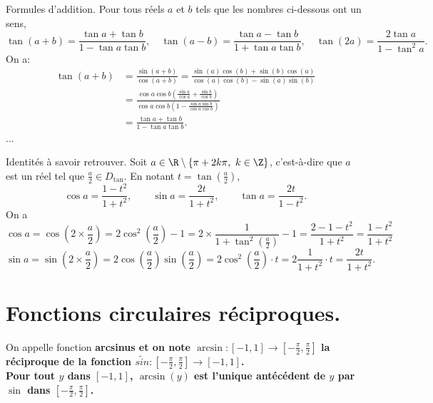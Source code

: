 \documentclass[11pt]{article}
\begin{document}
\begin{prop}{Formules d'addition.}{}
    Pour tous réels $a$ et $b$ tels que les nombres ci-dessous ont un sens,
    \begin{equation*}
        \tan(a+b)=\frac{\tan a+\tan b}{1-\tan a\tan b},\quad\tan(a-b)=\frac{\tan a-\tan b}{1+\tan a\tan b}, \quad \tan(2a)=\frac{2\tan a}{1-\tan^2a}.
    \end{equation*}
    \tcblower
    On a:
    \begin{align*}
        \tan(a+b)&=\frac{\sin(a+b)}{\cos(a+b)}=\frac{\sin(a)\cos(b)+\sin(b)\cos(a)}{\cos(a)\cos(b)-\sin(a)\sin(b)}\\
        &=\frac{\cos a\cos b\left( \frac{\sin a}{\cos a} + \frac{\sin b}{\cos b} \right)}{\cos a\cos b\left( 1 - \frac{\sin a\sin b}{\cos a\cos b} \right)}\\
        &=\frac{\tan a+\tan b}{1-\tan a\tan b}.
    \end{align*}
    ...
\end{prop}

\begin{corr}{Identités à savoir retrouver.}{}
    Soit $a\in\R\setminus\{\pi+2k\pi,~k\in\Z\}$, c'est-à-dire que $a$ est un réel tel que $\frac{a}{2}\in D_{\tan}$. En notant $t=\tan(\frac{a}{2})$,
    \begin{equation*}
        \cos a=\frac{1-t^2}{1+t^2}, \qquad \sin a=\frac{2t}{1+t^2}, \qquad \tan a=\frac{2t}{1-t^2}.
    \end{equation*}
    \tcblower
    On a
    \begin{equation*}
        \cos a=\cos(2\times\frac{a}{2})=2\cos^2(\frac{a}{2})-1=2\times\frac{1}{1+\tan^2(\frac{a}{2})}-1=\frac{2-1-t^2}{1+t^2}=\frac{1-t^2}{1+t^2}
    \end{equation*}
    \begin{equation*}
        \sin a = \sin(2\times\frac{a}{2})=2\cos(\frac{a}{2})\sin(\frac{a}{2})=2\cos^2(\frac{a}{2})\cdot t=2\frac{1}{1+t^2}\cdot t=\frac{2t}{1+t^2}.
    \end{equation*}
\end{corr}

\section{Fonctions circulaires réciproques.}

\begin{defi}{}{}
    On appelle fonction \bf{arcsinus} et on note $\arcsin:[-1,1]\to[-\frac{\pi}{2},\frac{\pi}{2}]$ la réciproque de la fonction $\tilde{sin}:[-\frac{\pi}{2},\frac{\pi}{2}]\to[-1,1]$.\\
    Pour tout $y$ dans $[-1,1]$, $\arcsin(y)$ est l'unique antécédent de $y$ par $\sin$ dans $[-\frac{\pi}{2},\frac{\pi}{2}]$.
\end{defi}
\end{document}
